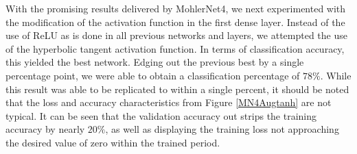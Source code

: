 \documentclass[12pt]{article}
\begin{document}
With the promising results delivered by MohlerNet4, we next experimented with the modification of the activation function in the first dense layer. Instead of the use of ReLU as is done in all previous networks and layers, we attempted the use of the hyperbolic tangent activation function. In terms of classification accuracy, this yielded the best network. Edging out the previous best by a single percentage point, we were able to obtain a classification percentage of $78\%$. While this result was able to be replicated to within a single percent, it should be noted that the loss and accuracy characteristics from Figure \ref{MN4Augtanh} are not typical. It can be seen that the validation accuracy out strips the training accuracy by nearly $20\%$, as well as displaying the training loss not approaching the desired value of zero within the trained period. 
\end{document}

